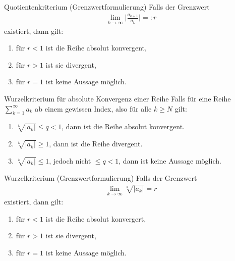 \begin{karte}{Quotientenkriterium (Grenzwertformulierung)}
	Falls der Grenzwert
	\begin{align}
		\lim_{k\to\infty} \lvert \frac{a_{k+1}}{a_k}\rvert =: r 
	\end{align}
	existiert, dann gilt:
	
	\begin{enumerate}[label=\(\triangleright \)]
		
		\item für \(r<1\) ist die Reihe absolut konvergent,
		\item für \(r>1\) ist sie divergent,
		\item für \(r=1\) ist keine Aussage möglich.
	\end{enumerate}
	
	
\end{karte}

\begin{karte}{Wurzelkriterium für absolute Konvergenz einer Reihe}
	Falls für eine Reihe \(\sum_{k=1}^{\infty}a_k\) ab einem gewissen Index, also für  alle \(k \geq N\) gilt:
	
	\begin{enumerate}[label=\(\triangleright \)]
		
		\item \(\sqrt[k]{\lvert a_k\rvert} \leq q < 1\), dann ist die Reihe absolut konvergent.
		      
		\item \(\sqrt[k]{\lvert a_k\rvert} \geq  1\), dann ist die Reihe divergent.
		      
		\item \(\sqrt[k]{\lvert a_k\rvert} \leq  1\), jedoch nicht \(\leq q <1\), dann ist keine  Aussage möglich.
	\end{enumerate}
	
\end{karte}

\begin{karte}{Wurzelkriterium (Grenzwertformulierung)}
	Falls der Grenzwert
	\begin{align}
		\lim_{k\to\infty} \sqrt[k]{\lvert a_k\rvert} = r 
	\end{align}
	existiert, dann gilt:
	\begin{enumerate}[label=\(\triangleright \)]
		\item für \(r < 1\) ist die Reihe absolut konvergert,
		\item für \(r > 1\) ist sie divergent,
		\item für \(r = 1\) ist keine Aussage möglich.
	\end{enumerate}
\end{karte}

